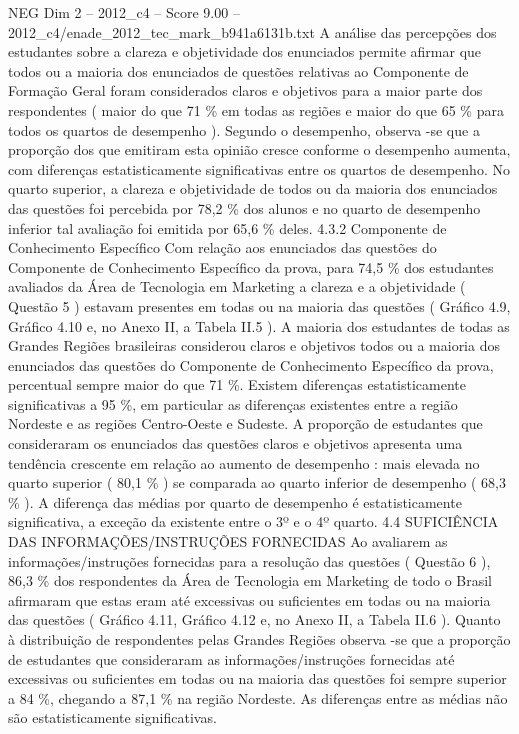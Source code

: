 \begin{textsample}{NEG Dim 2 – 2012\_c4 – Score 9.00 – 2012\_c4/enade\_2012\_tec\_mark\_b941a6131b.txt}
A análise das percepções dos estudantes sobre a clareza e objetividade dos enunciados permite afirmar que todos ou a maioria dos enunciados de questões relativas ao Componente de Formação Geral foram considerados claros e objetivos para a maior parte dos respondentes ( maior do que 71 \% em todas as regiões e maior do que 65 \% para todos os quartos de desempenho ).
Segundo o desempenho, observa -se que a proporção dos que emitiram esta opinião cresce conforme o desempenho aumenta, com diferenças estatisticamente significativas entre os quartos de desempenho.
No quarto superior, a clareza e objetividade de todos ou da maioria dos enunciados das questões foi percebida por 78,2 \% dos alunos e no quarto de desempenho inferior tal avaliação foi emitida por 65,6 \% deles. 4.3.2 Componente de Conhecimento Específico Com relação aos enunciados das questões do Componente de Conhecimento Específico da prova, para 74,5 \% dos estudantes avaliados da Área de Tecnologia em Marketing a clareza e a objetividade ( Questão 5 ) estavam presentes em todas ou na maioria das questões ( Gráfico 4.9, Gráfico 4.10 e, no Anexo II, a Tabela II.5 ).
A maioria dos estudantes de todas as Grandes Regiões brasileiras considerou claros e objetivos todos ou a maioria dos enunciados das questões do Componente de Conhecimento Específico da prova, percentual sempre maior do que 71 \%.
Existem diferenças estatisticamente significativas a 95 \%, em particular as diferenças existentes entre a região Nordeste e as regiões Centro-Oeste e Sudeste.
A proporção de estudantes que consideraram os enunciados das questões claros e objetivos apresenta uma tendência crescente em relação ao aumento de desempenho : mais elevada no quarto superior ( 80,1 \% ) se comparada ao quarto inferior de desempenho ( 68,3 \% ).
A diferença das médias por quarto de desempenho é estatisticamente significativa, a exceção da existente entre o 3º e o 4º quarto. 4.4 SUFICIÊNCIA DAS INFORMAÇÕES/INSTRUÇÕES FORNECIDAS Ao avaliarem as informações/instruções fornecidas para a resolução das questões ( Questão 6 ), 86,3 \% dos respondentes da Área de Tecnologia em Marketing de todo o Brasil afirmaram que estas eram até excessivas ou suficientes em todas ou na maioria das questões ( Gráfico 4.11, Gráfico 4.12 e, no Anexo II, a Tabela II.6 ).
Quanto à distribuição de respondentes pelas Grandes Regiões observa -se que a proporção de estudantes que consideraram as informações/instruções fornecidas até excessivas ou suficientes em todas ou na maioria das questões foi sempre superior a 84 \%, chegando a 87,1 \% na região Nordeste.
As diferenças entre as médias não são estatisticamente significativas.

\end{textsample}
